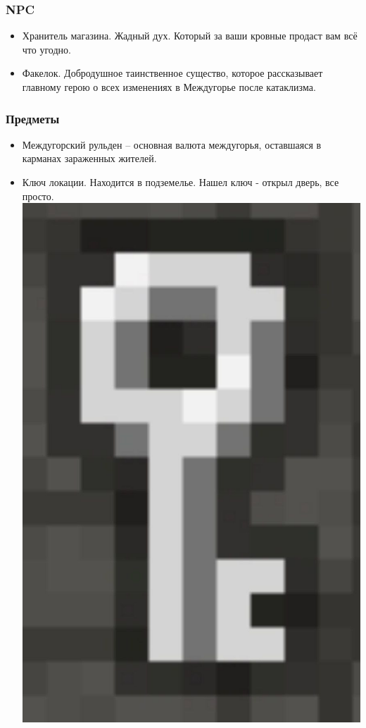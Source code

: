\documentclass{article}
\begin{document}
\subsubsection{NPC}
\begin{itemize}
\item Хранитель магазина. Жадный дух. Который за ваши кровные продаст вам всё что угодно.  
\item Факелок. Добродушное таинственное существо, которое рассказывает главному герою о всех изменениях в Междугорье после катаклизма.
\end{itemize}
\subsubsection{Предметы}
\begin{itemize}
\item Междугорский рульден – основная валюта междугорья, оставшаяся в карманах зараженных жителей.
\item Ключ локации. Находится в подземелье. Нашел ключ - открыл дверь, все просто.\\
\includegraphics[width=0.3\linewidth]{images/dd_kluch.jpg}
\end{itemize}
\end{document}
